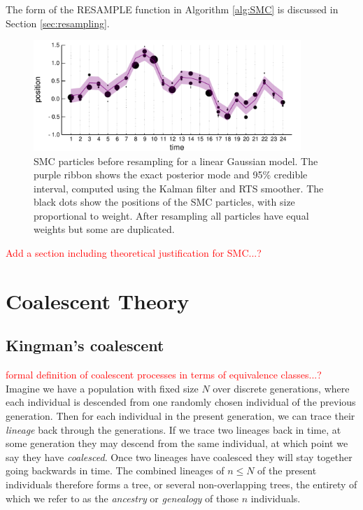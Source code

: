 \documentclass[fleqn]{article}
\begin{document}
The form of the {\footnotesize RESAMPLE} function in Algorithm \ref{alg:SMC} is discussed in Section \ref{sec:resampling}.

\begin{figure}
\centering
\includegraphics[width=0.9\textwidth]{smc_kalman.pdf}
\caption{SMC particles before resampling for a linear Gaussian model. The purple ribbon shows the exact posterior mode and 95\% credible interval, computed using the Kalman filter and RTS smoother. The black dots show the positions of the SMC particles, with size proportional to weight. After resampling all particles have equal weights but some are duplicated.}
\label{fig:SMC_vs_kalman}
\end{figure}

\textcolor{red}{
Add a section including theoretical justification for SMC...?
}\\

\section{Coalescent Theory}
\subsection{Kingman's coalescent}
\textcolor{red}{
formal definition of coalescent processes in terms of equivalence classes...?
}\\
Imagine we have a population with fixed size $N$ over discrete generations, where each individual is descended from one randomly chosen individual of the previous generation. Then for each individual in the present generation, we can trace their \emph{lineage} back through the generations. 
If we trace two lineages back in time, at some generation they may descend from the same individual, at which point we say they have \emph{coalesced}. Once two lineages have coalesced they will stay together going backwards in time.
The combined lineages of $n\leq N$ of the present individuals therefore forms a tree, or several non-overlapping trees, the entirety of which we refer to as the \emph{ancestry} or \emph{genealogy} of those $n$ individuals.
\end{document}
